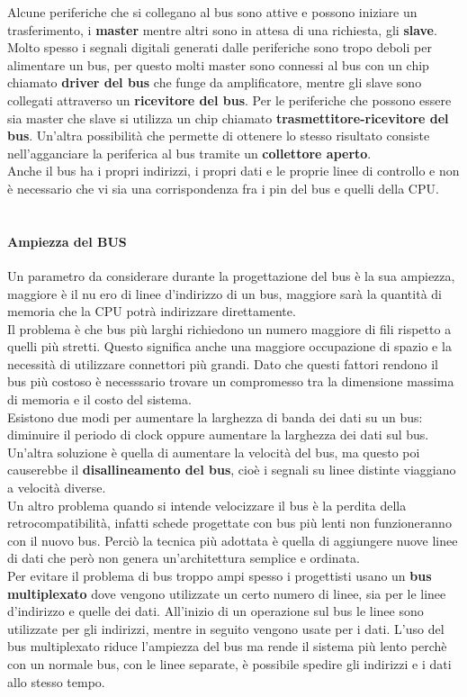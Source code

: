 \documentclass[12pt]{report}
\begin{document}
			 Alcune periferiche che si collegano al bus sono attive e possono iniziare un trasferimento, i \textbf{master} mentre altri sono in attesa di una richiesta, gli \textbf{slave}. \\
			 Molto spesso i segnali digitali generati dalle periferiche sono tropo deboli per alimentare un bus, per questo molti master sono connessi al bus con un chip chiamato \textbf{driver del bus} che funge da amplificatore, mentre gli slave sono collegati attraverso un \textbf{ricevitore del bus}. Per le periferiche che possono essere sia master che slave si utilizza un chip chiamato \textbf{trasmettitore-ricevitore del bus}. Un'altra possibilità che permette di ottenere lo stesso risultato consiste nell'agganciare la periferica al bus tramite un \textbf{collettore aperto}. \\
			 Anche il bus ha i propri indirizzi, i propri dati e le proprie linee di controllo e non è necessario che vi sia una corrispondenza fra i pin del bus e quelli della CPU.
			 \\ \\
			 \paragraph{Ampiezza del BUS}
			 Un parametro da considerare durante la progettazione del bus è la sua ampiezza, maggiore è il nu ero di linee d'indirizzo di un bus, maggiore sarà la quantità di memoria che la CPU potrà indirizzare direttamente. \\
			 Il problema è che bus più larghi richiedono un numero maggiore di fili rispetto a quelli più stretti. Questo significa anche una maggiore occupazione di spazio e la necessità di utilizzare connettori più grandi. Dato che questi fattori rendono il bus più costoso è necesssario trovare un compromesso tra la dimensione massima di memoria e il costo del sistema. \\
			 Esistono due modi per aumentare la larghezza di banda dei dati su un bus: diminuire il periodo di clock oppure aumentare la larghezza dei dati sul bus. Un'altra soluzione è quella di aumentare la velocità del bus, ma questo poi causerebbe il \textbf{disallineamento del bus}, cioè i segnali su linee distinte viaggiano a velocità diverse. \\
			 Un altro problema quando si intende velocizzare il bus è la perdita della retrocompatibilità, infatti schede progettate con bus più lenti non funzioneranno con il nuovo bus. Perciò la tecnica più adottata è quella di aggiungere nuove linee di dati che però non genera un'architettura semplice e ordinata. \\
			 Per evitare il problema di bus troppo ampi spesso i progettisti usano un \textbf{bus multiplexato} dove vengono utilizzate un certo numero di linee, sia per le linee d'indirizzo e quelle dei dati. All'inizio di un operazione sul bus le linee sono utilizzate per gli indirizzi, mentre in seguito vengono usate per i dati. L'uso del bus multiplexato riduce l'ampiezza del bus ma rende il sistema più lento perchè con un normale bus, con le linee separate, è possibile spedire gli indirizzi e i dati allo stesso tempo.
			 \\ \\
\end{document}
